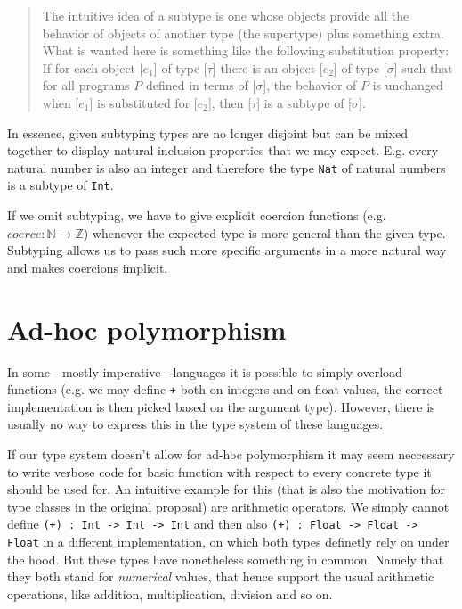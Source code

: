 \begin{quote}
The intuitive idea of a subtype is one whose objects provide all the behavior of objects of another type (the supertype) plus something extra.
What is wanted here is something like the following substitution property:
If for each object [$e_1$] of type [$\tau$] there is an object [$e_2$] of type [$\sigma$] such that for all programs $P$ defined in terms of [$\sigma$],
the behavior of $P$ is unchanged when [$e_1$] is substituted for [$e_2$], then [$\tau$] is a subtype of [$\sigma$].
\end{quote}

In essence, given subtyping types are no longer disjoint but can be mixed together to display natural inclusion properties that we may expect.
E.g. every natural number is also an integer and therefore the type \texttt{Nat} of natural numbers is a subtype of \texttt{Int}.

If we omit subtyping, we have to give explicit coercion functions (e.g. $\mathit{coerce} : \mathbb{N} \to \mathbb{Z}$) whenever the expected type is more general than the given type.
Subtyping allows us to pass such more specific arguments in a more natural way and makes coercions implicit.

\section{Ad-hoc polymorphism}\label{sec:ad-hoc-polymorphism}

In some - mostly imperative - languages it is possible to simply overload functions (e.g. we may define \texttt{+} both on integers and on float values, the correct implementation is then picked based on the argument type).
However, there is usually no way to express this in the type system of these languages. %

If our type system doesn't allow for ad-hoc polymorphism it may seem neccessary to write verbose code for basic function with respect to every concrete type it should be used for.
An intuitive example for this (that is also the motivation for type classes in the original proposal) are arithmetic operators.
We simply cannot define \texttt{(+) : Int -> Int -> Int} and then also \texttt{(+) : Float -> Float -> Float} in a different implementation, on which both types definetly rely on under the hood.
But these types have nonetheless something in common. Namely that they both stand for \emph{numerical} values, that hence support the usual arithmetic operations, like addition, multiplication, division and so on.

